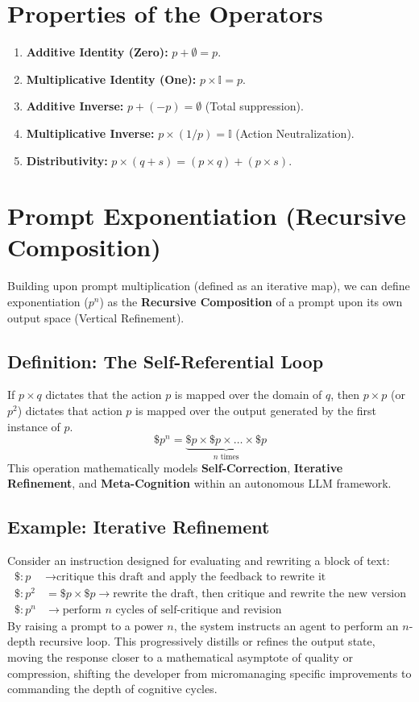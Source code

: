 \documentclass[11pt, a4paper]{article}
\begin{document}
\section{Properties of the Operators}
\begin{enumerate}
    \item \textbf{Additive Identity (Zero):} $p + \emptyset = p$.
    \item \textbf{Multiplicative Identity (One):} $p \times \mathbb{I} = p$.
    \item \textbf{Additive Inverse:} $p + (-p) = \emptyset$ (Total suppression).
    \item \textbf{Multiplicative Inverse:} $p \times (1/p) = \mathbb{I}$ (Action Neutralization).
    \item \textbf{Distributivity:} $p \times (q + s) = (p \times q) + (p \times s)$.
\end{enumerate}

\section{Prompt Exponentiation (Recursive Composition)}
Building upon prompt multiplication (defined as an iterative map), we can define exponentiation ($p^n$) as the \textbf{Recursive Composition} of a prompt upon its own output space (Vertical Refinement).

\subsection{Definition: The Self-Referential Loop}
If $p \times q$ dictates that the action $p$ is mapped over the domain of $q$, then $p \times p$ (or $p^2$) dictates that action $p$ is mapped over the output generated by the first instance of $p$.
$$ \$p^n = \underbrace{\$p \times \$p \times \dots \times \$p}_{n \text{ times}} $$
This operation mathematically models \textbf{Self-Correction}, \textbf{Iterative Refinement}, and \textbf{Meta-Cognition} within an autonomous LLM framework.

\subsection{Example: Iterative Refinement}
Consider an instruction designed for evaluating and rewriting a block of text:
\begin{align*}
    \$: p &\rightarrow \text{critique this draft and apply the feedback to rewrite it} \\
    \$: p^2 &= \$p \times \$p \rightarrow \text{rewrite the draft, then critique and rewrite the new version} \\
    \$: p^n &\rightarrow \text{perform } n \text{ cycles of self-critique and revision}
\end{align*}
By raising a prompt to a power $n$, the system instructs an agent to perform an $n$-depth recursive loop. This progressively distills or refines the output state, moving the response closer to a mathematical asymptote of quality or compression, shifting the developer from micromanaging specific improvements to commanding the depth of cognitive cycles.
\end{document}
